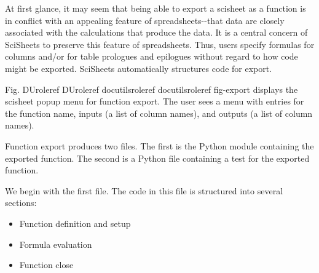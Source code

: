 \documentclass[letterpaper,compsoc,twoside]{IEEEtran}
\providecommand*{\DUrole}[2]{%
  \ifcsname DUrole#1\endcsname%
    \csname DUrole#1\endcsname{#2}%
  \else%
    \ifcsname docutilsrole#1\endcsname%
      \csname docutilsrole#1\endcsname{#2}%
    \else%
      #2%
    \fi%
  \fi%
}
\begin{document}
At first glance, it may seem that being able to export
a scisheet as a function is in conflict with
an appealing feature of spreadsheets-{}-that
data are closely associated with the calculations that produce the data.
It is a central concern of SciSheets to preserve this
feature of spreadsheets.
Thus, users specify formulas for columns and/or for table prologues and epilogues
without regard to how code might be exported.
SciSheets automatically structures code for export.

Fig. \DUrole{ref}{fig-export} displays the scisheet popup menu for
function export.
The user sees a menu with entries for the function name,
inputs (a list of column names),
and outputs (a list of column names).

Function export produces two files.
The first is the Python module containing the exported function.
The second is a Python file containing a test for the exported function.

We begin with the first file.
The code in this file is structured into several sections:%
\begin{itemize}

\item 

Function definition and setup
\item 

Formula evaluation
\item 

Function close
\end{itemize}
\end{document}
